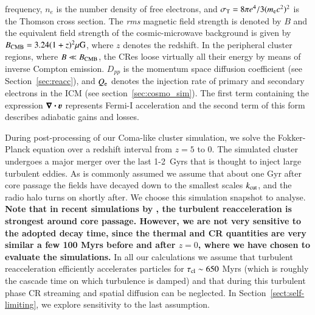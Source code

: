 \documentclass[fleqn,usenatbib,useAMS]{mnras}
\newcommand{\bcdot}{\ensuremath{%
  \mathchoice%
   {\mskip\thinmuskip\lower0.2ex\hbox{\scalebox{1.5}{$\cdot$}}\mskip\thinmuskip}}%
   {\mskip\thinmuskip\lower0.2ex\hbox{\scalebox{1.5}{$\cdot$}}\mskip\thinmuskip}%
   {\lower0.3ex\hbox{\scalebox{1.2}{$\cdot$}}}%
   {\lower0.3ex\hbox{\scalebox{1.2}{$\cdot$}}}%
}
\newcommand\C[1]{{\bf #1}}
\newcommand{\bvel}{\ensuremath{\boldsymbol{\varv}}}
\newcommand{\bnabla}{\ensuremath{\boldsymbol{\nabla}}}
\begin{document}
frequency, $n_e$ is the number density of free electrons, and
$\sigma_{\mathrm{T}}= 8\pi e^4/3(m_{{\mathrm{e}}} c^2)^2$ is the Thomson cross
section. The {\it rms} magnetic field strength is denoted by $B$ and
the equivalent field strength of the cosmic-microwave background is
given by $B_{\mathrm{CMB}} = 3.24 (1 + z)^2\mu{\mathrm{G}}$, where $z$ denotes
the redshift. In the peripheral cluster regions, where $B \ll
B_{\mathrm{CMB}}$, the CRes loose virtually all their energy by means of
inverse Compton emission. $D_{pp}$ is the momentum space diffusion
coefficient (see Section~\ref{sec:reacc}), and
$Q_{{\mathrm{e}}}$ denotes the injection rate of primary and secondary
electrons in the ICM (see section~\ref{sec:cosmo_sim}). The first term
containing the expression $\bnabla\bcdot \bvel$ represents Fermi-I
acceleration and the second term of this form describes adiabatic
gains and losses.

During post-processing of our Coma-like cluster simulation, we solve the
Fokker-Planck equation over a redshift interval from $z=5$ to 0. The simulated
cluster undergoes a major merger over the last 1-2~Gyrs that is thought to
inject large turbulent eddies. As is commonly assumed
\citep{brunetti07,brunetti11,2004ApJ...614..757Y,2013ApJ...771..131B} we assume
that about one Gyr after core passage the fields have decayed down to the
smallest scales $k_{\rm cut}$, and the radio halo turns on shortly after. We
choose this simulation snapshot to analyse. \C{Note that in recent simulations by \citet{miniati15}, the turbulent reacceleration is strongest around core passage. However, we are not very sensitive to the adopted decay time, since the thermal and CR quantities are very similar a few 100 Myrs before and after $z = 0$, where we have chosen to evaluate the simulations.}
In all our calculations we assume that turbulent reacceleration efficiently
accelerates particles for $\tau_{\rm cl} \sim 650$ Myrs (which is roughly the
cascade time on which turbulence is damped) and that during this turbulent phase
CR streaming and spatial diffusion can be neglected. In
Section~\ref{sect:self-limiting}, we explore sensitivity to the last assumption.
\end{document}
